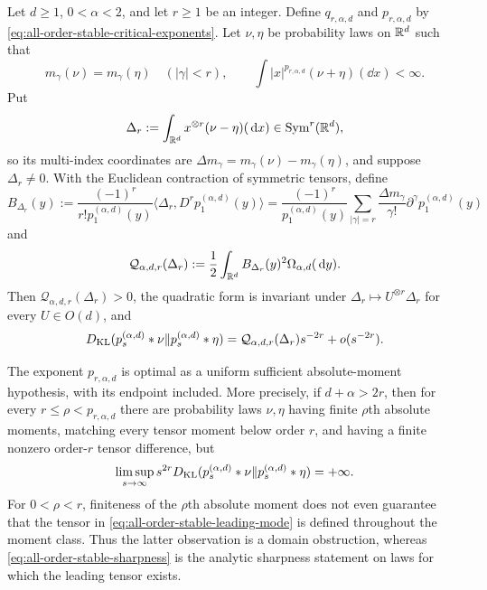 \begin{theorem}
\label{thm:all-order-stable-first-unmatched-moment}
Let \(d\ge1\), \(0<\alpha<2\), and let \(r\ge1\) be an integer.  Define
\(q_{r,\alpha,d}\) and \(p_{r,\alpha,d}\) by
\eqref{eq:all-order-stable-critical-exponents}.  Let \(\nu,\eta\) be
probability laws on \(\mathbb{R}^d\) such that
\begin{equation}\label{eq:all-order-stable-moment-hypotheses}
 m_\gamma(\nu)=m_\gamma(\eta)\quad(|\gamma|<r),
 \qquad
 \int|x|^{p_{r,\alpha,d}}(\nu+\eta)(\dd x)<\infty.
\end{equation}
Put
\[
 \Delta_r:=\int_{\mathbb{R}^d}x^{\otimes r}(\nu-\eta)(\,\mathrm{d} x)
 \in\operatorname{Sym}^r(\mathbb{R}^d),
\]
so its multi-index coordinates are
\(\Delta m_\gamma=m_\gamma(\nu)-m_\gamma(\eta)\), and suppose
\(\Delta_r\ne0\).  With the Euclidean contraction of symmetric tensors,
define
\begin{equation}\label{eq:all-order-stable-leading-mode}
 B_{\Delta_r}(y):=
 \frac{(-1)^r}{r!p_1^{(\alpha,d)}(y)}
 \langle\Delta_r,D^rp_1^{(\alpha,d)}(y)\rangle
 =\frac{(-1)^r}{p_1^{(\alpha,d)}(y)}
 \sum_{|\gamma|=r}\frac{\Delta m_\gamma}{\gamma!}
 \partial^\gamma p_1^{(\alpha,d)}(y)
\end{equation}
and
\begin{equation}\label{eq:all-order-stable-leading-functional}
 \mathcal Q_{\alpha,d,r}(\Delta_r)
 :=\frac12\int_{\mathbb{R}^d}B_{\Delta_r}(y)^2
                  \Omega_{\alpha,d}(\,\mathrm{d} y).
\end{equation}
Then \(\mathcal Q_{\alpha,d,r}(\Delta_r)>0\), the quadratic form is
invariant under \(\Delta_r\mapsto U^{\otimes r}\Delta_r\) for every
\(U\in O(d)\), and
\begin{equation}\label{eq:all-order-stable-first-unmatched-asymptotic}
 D_{\rm KL}(p_s^{(\alpha,d)}*\nu\|p_s^{(\alpha,d)}*\eta)
 =\mathcal Q_{\alpha,d,r}(\Delta_r)s^{-2r}+o(s^{-2r}).
\end{equation}

The exponent \(p_{r,\alpha,d}\) is optimal as a uniform sufficient
absolute-moment hypothesis, with its endpoint included.  More precisely,
if \(d+\alpha>2r\), then for every
\(r\le\rho<p_{r,\alpha,d}\) there are probability laws \(\nu,\eta\)
having finite \(\rho\)th absolute moments, matching every tensor moment
below order \(r\), and having a finite nonzero order-\(r\) tensor difference,
but
\begin{equation}\label{eq:all-order-stable-sharpness}
 \limsup_{s\to\infty}s^{2r}
 D_{\rm KL}(p_s^{(\alpha,d)}*\nu\|p_s^{(\alpha,d)}*\eta)=+\infty.
\end{equation}
For \(0<\rho<r\), finiteness of the \(\rho\)th absolute moment does not
even guarantee that the tensor in \eqref{eq:all-order-stable-leading-mode}
is defined throughout the moment class.  Thus the latter observation is a
domain obstruction, whereas \eqref{eq:all-order-stable-sharpness} is the
analytic sharpness statement on laws for which the leading tensor exists.
\end{theorem}

